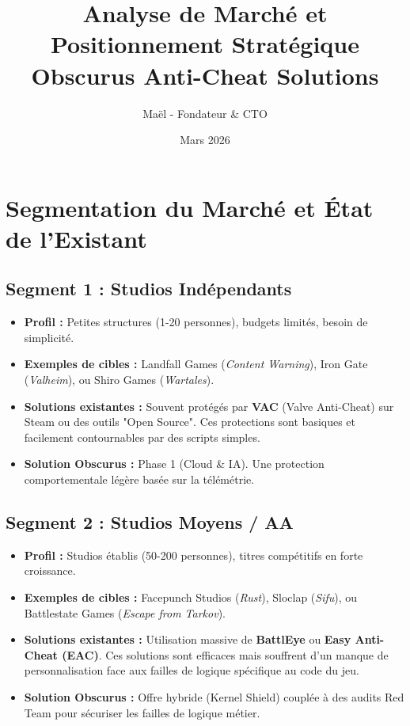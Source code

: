 \documentclass[12pt,a4paper]{article}
\title{\textbf{Analyse de Marché et Positionnement Stratégique \\ Obscurus Anti-Cheat Solutions}}
\author{Maël - Fondateur \& CTO}
\date{Mars 2026}
\begin{document}
\maketitle

\section{Segmentation du Marché et État de l'Existant}

\subsection{Segment 1 : Studios Indépendants}
\begin{itemize}
    \item \textbf{Profil :} Petites structures (1-20 personnes), budgets limités, besoin de simplicité.
    \item \textbf{Exemples de cibles :} Landfall Games (\textit{Content Warning}), Iron Gate (\textit{Valheim}), ou Shiro Games (\textit{Wartales}).
    \item \textbf{Solutions existantes :} Souvent protégés par \textbf{VAC} (Valve Anti-Cheat) sur Steam ou des outils "Open Source". Ces protections sont basiques et facilement contournables par des scripts simples.
    \item \textbf{Solution Obscurus :} Phase 1 (Cloud \& IA). Une protection comportementale légère basée sur la télémétrie.
\end{itemize}

\subsection{Segment 2 : Studios Moyens / AA}
\begin{itemize}
    \item \textbf{Profil :} Studios établis (50-200 personnes), titres compétitifs en forte croissance.
    \item \textbf{Exemples de cibles :} Facepunch Studios (\textit{Rust}), Sloclap (\textit{Sifu}), ou Battlestate Games (\textit{Escape from Tarkov}).
    \item \textbf{Solutions existantes :} Utilisation massive de \textbf{BattlEye} ou \textbf{Easy Anti-Cheat (EAC)}. Ces solutions sont efficaces mais souffrent d'un manque de personnalisation face aux failles de logique spécifique au code du jeu.
    \item \textbf{Solution Obscurus :} Offre hybride (Kernel Shield) couplée à des audits Red Team pour sécuriser les failles de logique métier.
\end{itemize}
\end{document}
